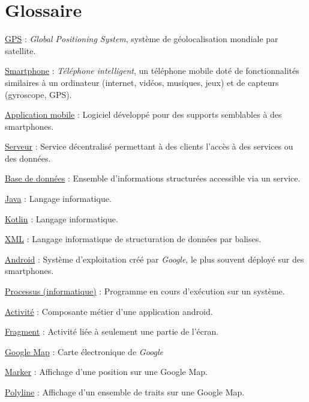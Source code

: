 \section{Glossaire}

\underline{GPS} : \emph{Global Positioning System}, système de géolocalisation mondiale par satellite.

\vspace{10pt}
\underline{Smartphone} : \emph{Téléphone intelligent}, un téléphone mobile doté de fonctionnalités similaires
à un ordinateur (internet, vidéos, musiques, jeux) et de capteurs (gyroscope, GPS).

\vspace{10pt}
\underline{Application mobile} : Logiciel développé pour des supports semblables à des smartphones.

\vspace{10pt}
\underline{Serveur} : Service décentralisé permettant à des clients l'accès à des services ou des données.

\vspace{10pt}
\underline{Base de données} : Ensemble d'informations structurées accessible via un service.

\vspace{10pt}
\underline{Java} : Langage informatique.

\vspace{10pt}
\underline{Kotlin} : Langage informatique.

\vspace{10pt}
\underline{XML} : Langage informatique de structuration de données par balises.

\vspace{10pt}
\underline{Android} : Système d'exploitation créé par \emph{Google}, le plus souvent déployé sur des smartphones.

\vspace{10pt}
\underline{Processus (informatique)} : Programme en cours d'exécution sur un système.

\vspace{10pt}
\underline{Activité} : Composante métier d'une application android.

\vspace{10pt}
\underline{Fragment} : Activité liée à seulement une partie de l'écran.

\vspace{10pt}
\underline{Google Map} : Carte électronique de \emph{Google}

\vspace{10pt}
\underline{Marker} : Affichage d'une position sur une Google Map.

\vspace{10pt}
\underline{Polyline} : Affichage d'un ensemble de traits sur une Google Map.

